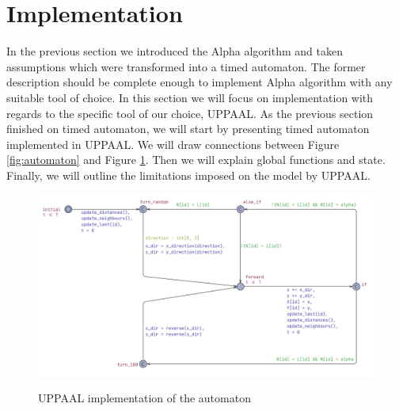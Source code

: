 \section{Implementation}
In the previous section we introduced the Alpha algorithm and taken assumptions which were transformed into a timed automaton. The former description should be complete enough to implement Alpha algorithm with any suitable tool of choice. In this section we will focus on implementation with regards to the specific tool of our choice, UPPAAL. As the previous section finished on timed automaton, we will start by presenting timed automaton implemented in UPPAAL. We will draw connections between Figure \ref{fig:automaton} and Figure \ref{fig:automaton_uppaal}. Then we will explain global functions and state. Finally, we will outline the limitations imposed on the model by UPPAAL.

\begin{figure}[H]
\caption{UPPAAL implementation of the automaton}
\includegraphics[scale=0.3]{images/automaton_uppaal.png}
\label{fig:automaton_uppaal}
\end{figure}

